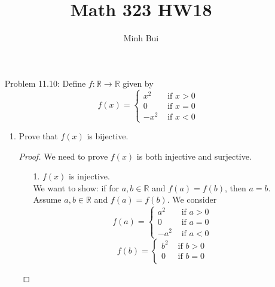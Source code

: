 \documentclass{article}
\author{Minh Bui}
\title{Math 323 HW18}
\theoremstyle{claim}
\theoremstyle{definition}
\begin{document}
\maketitle
\begin{enumerate}
    \item[Problem 11.10:] Define $f: \mathbb{R} \rightarrow \mathbb{R}$ given by\
        \begin{equation*}
            f(x) = \left\{
                \begin{array}{rl}
                    x^2 & \text{ if } x > 0\\
                    0 & \text{ if } x = 0\\
                    -x^2 & \text{ if } x < 0
                \end{array} \right.
        \end{equation*}
        \begin{enumerate}
            \item Prove that $f(x)$ is bijective.
            \begin{proof}
                We need to prove $f(x)$ is both injective and surjective.
                \begin{enumerate}
                    \item[1.] $f(x)$ is injective.\\
                        We want to show: if for $a, b \in \mathbb{R}$ and $f(a) = f(b)$, then $a = b$.\\
                        Assume $a, b \in \mathbb{R}$ and $f(a) = f(b)$. We consider
                        \begin{equation*}
                            f(a) = \left\{
                                \begin{array}{rl}
                                    a^2 & \text{ if } a > 0\\
                                    0 & \text{ if } a = 0\\
                                    -a^2 & \text{ if } a < 0
                                \end{array} \right.
                        \end{equation*}
                        \begin{equation*}
                            f(b) = \left\{
                                \begin{array}{rl}
                                    b^2 & \text{ if } b > 0\\
                                    0 & \text{ if } b = 0\\

\end{array}
\end{equation*}
\end{enumerate}
\end{proof}
\end{enumerate}
\end{enumerate}
\end{document}
